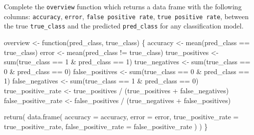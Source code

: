 \documentclass[
  letterpaper,
  DIV=11,
  numbers=noendperiod]{scrartcl}
\newenvironment{Shaded}{\begin{snugshade}}{\end{snugshade}}
\newcommand{\AttributeTok}[1]{\textcolor[rgb]{0.40,0.45,0.13}{#1}}
\newcommand{\ControlFlowTok}[1]{\textcolor[rgb]{0.00,0.23,0.31}{#1}}
\newcommand{\DecValTok}[1]{\textcolor[rgb]{0.68,0.00,0.00}{#1}}
\newcommand{\FunctionTok}[1]{\textcolor[rgb]{0.28,0.35,0.67}{#1}}
\newcommand{\NormalTok}[1]{\textcolor[rgb]{0.00,0.23,0.31}{#1}}
\newcommand{\OtherTok}[1]{\textcolor[rgb]{0.00,0.23,0.31}{#1}}
\newcommand{\SpecialCharTok}[1]{\textcolor[rgb]{0.37,0.37,0.37}{#1}}
\begin{document}
Complete the \texttt{overview} function which returns a data frame with
the following columns: \texttt{accuracy}, \texttt{error},
\texttt{false\ positive\ rate}, \texttt{true\ positive\ rate}, between
the true \texttt{true\_class} and the predicted \texttt{pred\_class} for
any classification model.

\begin{Shaded}
\begin{Highlighting}[]
\NormalTok{overview }\OtherTok{\textless{}{-}} \ControlFlowTok{function}\NormalTok{(pred\_class, true\_class) \{}
\NormalTok{  accuracy }\OtherTok{\textless{}{-}} \FunctionTok{mean}\NormalTok{(pred\_class }\SpecialCharTok{==}\NormalTok{ true\_class)}
\NormalTok{  error }\OtherTok{\textless{}{-}} \FunctionTok{mean}\NormalTok{(pred\_class }\SpecialCharTok{!=}\NormalTok{ true\_class)}
\NormalTok{  true\_positives }\OtherTok{\textless{}{-}} \FunctionTok{sum}\NormalTok{(true\_class }\SpecialCharTok{==} \DecValTok{1} \SpecialCharTok{\&}\NormalTok{ pred\_class }\SpecialCharTok{==} \DecValTok{1}\NormalTok{)}
\NormalTok{  true\_negatives }\OtherTok{\textless{}{-}} \FunctionTok{sum}\NormalTok{(true\_class }\SpecialCharTok{==} \DecValTok{0} \SpecialCharTok{\&}\NormalTok{ pred\_class }\SpecialCharTok{==} \DecValTok{0}\NormalTok{)}
\NormalTok{  false\_positives }\OtherTok{\textless{}{-}} \FunctionTok{sum}\NormalTok{(true\_class }\SpecialCharTok{==} \DecValTok{0} \SpecialCharTok{\&}\NormalTok{ pred\_class }\SpecialCharTok{==} \DecValTok{1}\NormalTok{)}
\NormalTok{  false\_negatives }\OtherTok{\textless{}{-}} \FunctionTok{sum}\NormalTok{(true\_class }\SpecialCharTok{==} \DecValTok{1} \SpecialCharTok{\&}\NormalTok{ pred\_class }\SpecialCharTok{==} \DecValTok{0}\NormalTok{)}
\NormalTok{  true\_positive\_rate }\OtherTok{\textless{}{-}}\NormalTok{ true\_positives }\SpecialCharTok{/}\NormalTok{ (true\_positives }\SpecialCharTok{+}\NormalTok{ false\_negatives)}
\NormalTok{  false\_positive\_rate }\OtherTok{\textless{}{-}}\NormalTok{ false\_positives }\SpecialCharTok{/}\NormalTok{ (true\_negatives }\SpecialCharTok{+}\NormalTok{ false\_positives)}
  
  \FunctionTok{return}\NormalTok{(}
    \FunctionTok{data.frame}\NormalTok{(}
      \AttributeTok{accuracy =}\NormalTok{ accuracy,}
      \AttributeTok{error =}\NormalTok{ error,}
      \AttributeTok{true\_positive\_rate =}\NormalTok{ true\_positive\_rate,}
      \AttributeTok{false\_positive\_rate =}\NormalTok{ false\_positive\_rate}
\NormalTok{    )}
\NormalTok{  )}
\NormalTok{\}}
\end{Highlighting}
\end{Shaded}
\end{document}
